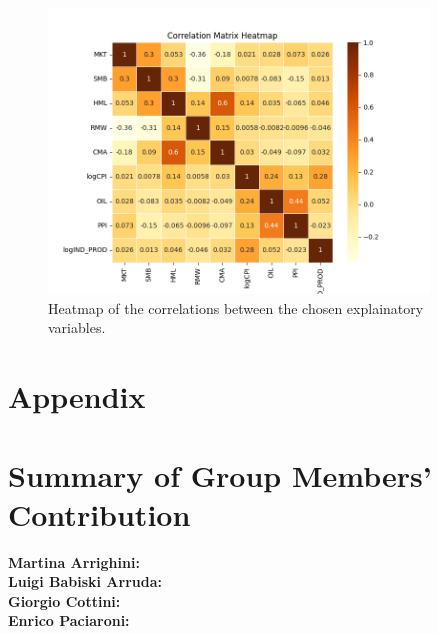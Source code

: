 \documentclass[12pt, openright, twoside]{report}
\begin{document}
\begin{figure}[h!]
    \centering
    \includegraphics[width=0.9\textwidth]{images/Correlation_heatmap.png}
    \caption{Heatmap of the correlations between the chosen explainatory variables.}\label{fig:Correlation_heatmap}
\end{figure}
\section*{Appendix}

\section*{Summary of Group Members' Contribution}

\textbf{Martina Arrighini:}\\
\textbf{Luigi Babiski Arruda:}\\ 
\textbf{Giorgio Cottini:}\\
\textbf{Enrico Paciaroni:}\\

\end{document}
